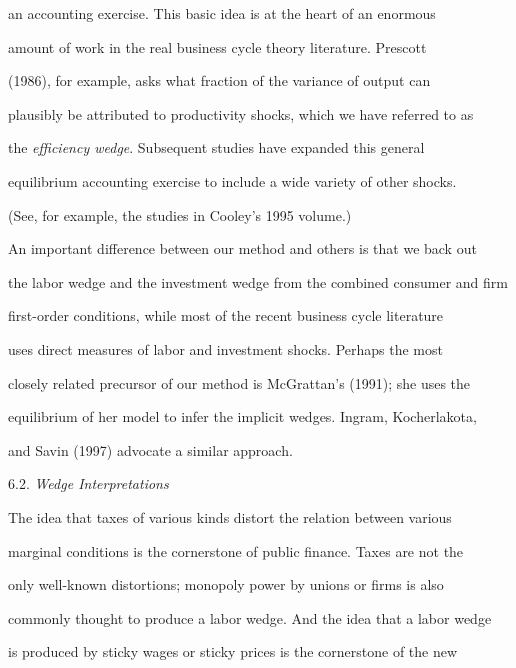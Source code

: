 \documentclass[fleqn,leqno,11pt]{article}
\begin{document}
an accounting exercise. This basic idea is at the heart of an enormous

amount of work in the real business cycle theory literature. Prescott

(1986), for example, asks what fraction of the variance of output can

plausibly be attributed to productivity shocks, which we have referred to as

the \emph{efficiency wedge}. Subsequent studies have expanded this general

equilibrium accounting exercise to include a wide variety of other shocks.

(See, for example, the studies in Cooley's 1995 volume.)



An important difference between our method and others is that we back out

the labor wedge and the investment wedge from the combined consumer and firm

first-order conditions, while most of the recent business cycle literature

uses direct measures of labor and investment shocks. Perhaps the most

closely related precursor of our method is McGrattan's (1991); she uses the

equilibrium of her model to infer the implicit wedges. Ingram, Kocherlakota,

and Savin (1997) advocate a similar approach.



\bigskip



\begin{center}

6.2. \emph{Wedge Interpretations}

\end{center}



The idea that taxes of various kinds distort the relation between various

marginal conditions is the cornerstone of public finance. Taxes are not the

only well-known distortions; monopoly power by unions or firms is also

commonly thought to produce a labor wedge. And the idea that a labor wedge

is produced by sticky wages or sticky prices is the cornerstone of the new
\end{document}
